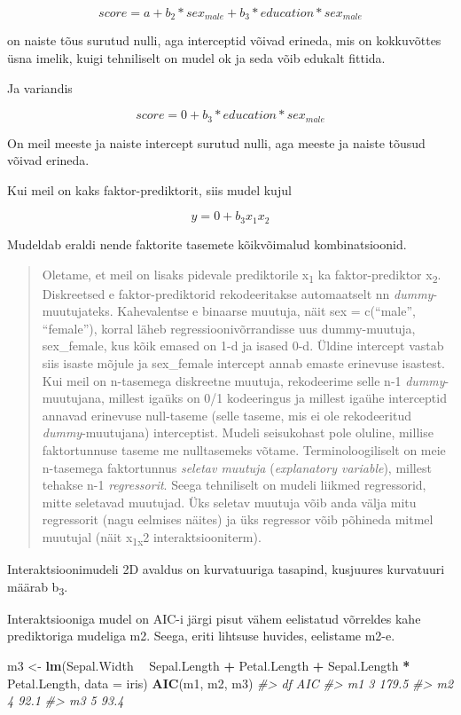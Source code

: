 \documentclass[]{book}
\newenvironment{Shaded}{\begin{snugshade}}{\end{snugshade}}
\newcommand{\CommentTok}[1]{\textcolor[rgb]{0.56,0.35,0.01}{\textit{#1}}}
\newcommand{\DataTypeTok}[1]{\textcolor[rgb]{0.13,0.29,0.53}{#1}}
\newcommand{\KeywordTok}[1]{\textcolor[rgb]{0.13,0.29,0.53}{\textbf{#1}}}
\newcommand{\NormalTok}[1]{#1}
\newcommand{\OperatorTok}[1]{\textcolor[rgb]{0.81,0.36,0.00}{\textbf{#1}}}
\newcommand{\StringTok}[1]{\textcolor[rgb]{0.31,0.60,0.02}{#1}}
\begin{document}
\[score = a +  b_2 * sex_{male} + b_3 * education * sex_{male}\]

on naiste tõus surutud nulli, aga interceptid võivad erineda, mis on kokkuvõttes üsna imelik, kuigi tehniliselt on mudel ok ja seda võib edukalt fittida.

Ja variandis

\[score = 0 + b_3 * education * sex_{male}\]

On meil meeste ja naiste intercept surutud nulli, aga meeste ja naiste tõusud võivad erineda.

Kui meil on kaks faktor-prediktorit, siis mudel kujul

\[y= 0 + b_3x_1x_2\]

Mudeldab eraldi nende faktorite tasemete kõikvõimalud kombinatsioonid.

\begin{quote}
Oletame, et meil on lisaks pidevale prediktorile x\textsubscript{1} ka faktor-prediktor x\textsubscript{2}. Diskreetsed e faktor-prediktorid rekodeeritakse automaatselt nn \emph{dummy}-muutujateks. Kahevalentse e binaarse muutuja, näit sex = c(``male'', ``female''), korral läheb regressioonivõrrandisse uus dummy-muutuja, sex\_female, kus kõik emased on 1-d ja isased 0-d. Üldine intercept vastab siis isaste mõjule ja sex\_female intercept annab emaste erinevuse isastest. Kui meil on n-tasemega diskreetne muutuja, rekodeerime selle n-1 \emph{dummy}-muutujana, millest igaüks on 0/1 kodeeringus ja millest igaühe interceptid annavad erinevuse null-taseme (selle taseme, mis ei ole rekodeeritud \emph{dummy}-muutujana) interceptist. Mudeli seisukohast pole oluline, millise faktortunnuse taseme me nulltasemeks võtame. Terminoloogiliselt on meie n-tasemega faktortunnus \emph{seletav muutuja} (\emph{explanatory variable}), millest tehakse n-1 \emph{regressorit}. Seega tehniliselt on mudeli liikmed regressorid, mitte seletavad muutujad. Üks seletav muutuja võib anda välja mitu regressorit (nagu eelmises näites) ja üks regressor võib põhineda mitmel muutujal (näit x\textsubscript{1x}2 interaktsiooniterm).
\end{quote}

Interaktsioonimudeli 2D avaldus on kurvatuuriga tasapind, kusjuures kurvatuuri määrab b\textsubscript{3}.

Interaktsiooniga mudel on AIC-i järgi pisut vähem eelistatud võrreldes kahe prediktoriga mudeliga m2.
Seega, eriti lihtsuse huvides, eelistame m2-e.

\begin{Shaded}
\begin{Highlighting}[]
\NormalTok{m3 <-}\StringTok{ }\KeywordTok{lm}\NormalTok{(Sepal.Width }\OperatorTok{~}\StringTok{ }\NormalTok{Sepal.Length }\OperatorTok{+}\StringTok{ }\NormalTok{Petal.Length }\OperatorTok{+}\StringTok{ }\NormalTok{Sepal.Length }\OperatorTok{*}\StringTok{ }\NormalTok{Petal.Length, }\DataTypeTok{data =}\NormalTok{ iris)}
\KeywordTok{AIC}\NormalTok{(m1, m2, m3)}
\CommentTok{#>    df   AIC}
\CommentTok{#> m1  3 179.5}
\CommentTok{#> m2  4  92.1}
\CommentTok{#> m3  5  93.4}
\end{Highlighting}
\end{Shaded}
\end{document}
